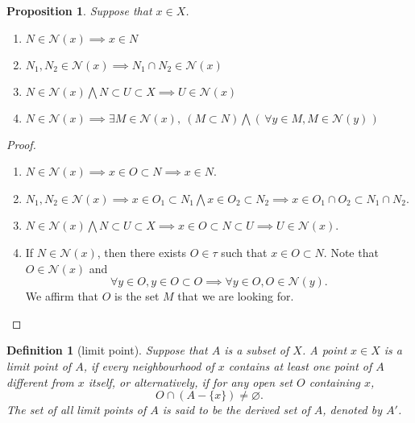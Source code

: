 \documentclass{report}
\newtheorem{definition}{Definition}[section]
\newtheorem{proposition}{Proposition}[section]
\theoremstyle{nonumberplain}
\newtheorem{proof}{Proof.}
\begin{document}
\begin{proposition}
	Suppose that $x\in X$.
	\begin{enumerate}	
		\item $N\in\mathcal{N}(x)\implies x\in N$ 
		\item $N_1,N_2\in\mathcal{N}(x)\implies N_1\cap N_2\in\mathcal{N}(x)$
		\item $N\in\mathcal{N}(x)\bigwedge N\subset U\subset X\implies U\in\mathcal{N}(x)$
		\item $N\in\mathcal{N}(x)\implies \exists M\in\mathcal{N}(x),\ (M\subset N)\bigwedge(\,\forall y\in M,M\in\mathcal{N}(y)\hspace{1pt})$
	\end{enumerate}
\end{proposition}
\begin{proof}~\\ \vspace{-1em}
	\begin{enumerate}	
		\item $N\in\mathcal{N}(x)\implies x\in O\subset N \implies x\in N$.
		\item $N_1,N_2\in\mathcal{N}(x)\implies x\in O_1\subset N_1 \bigwedge x\in O_2\subset N_2\implies x\in O_1\cap O_2\subset N_1\cap N_2$.
		\item $N\in\mathcal{N}(x)\bigwedge N\subset U\subset X\implies x\in O\subset N\subset U\implies U\in\mathcal{N}(x)$.
		\item If $N\in\mathcal{N}(x)$, then there exists $O\in\tau$ such that $x\in O\subset N$. Note that $O\in \mathcal{N}(x)$ and
		\[
		\forall y\in O,y\in O\subset O\implies\forall y\in O,O\in\mathcal{N}(y).
		\]
		We affirm that $O$ is the set $M$ that we are looking for.
	\end{enumerate}
\end{proof}
\begin{definition}[limit point]
	Suppose that $A$ is a subset of $X$. A point $x\in X$ is a \emph{limit point} of $A$, if every neighbourhood of $x$ contains at least one point of $A$ different from $x$ itself,
	or alternatively, if for any open set $O$ containing $x$,
	\[
	O\cap(A-\{x\})\ne\varnothing.
	\]
    The set of all limit points of $A$ is said to be the \emph{derived set} of $A$, denoted by $A'$.
\end{definition}
\end{document}
